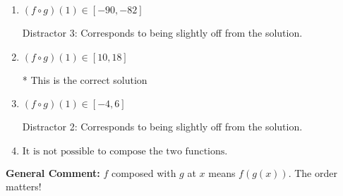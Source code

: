 \documentclass{extbook}[14pt]
\begin{document}
\begin{enumerate}
{\begin{enumerate}[label=\Alph*.]
 Distractor 1: Corresponds to reversing the composition.
\item \( (f \circ g)(1) \in [-90, -82] \)

 Distractor 3: Corresponds to being slightly off from the solution.
\item \( (f \circ g)(1) \in [10, 18] \)

* This is the correct solution
\item \( (f \circ g)(1) \in [-4, 6] \)

 Distractor 2: Corresponds to being slightly off from the solution.
\item \( \text{It is not possible to compose the two functions.} \)


\end{enumerate}

\textbf{General Comment:} $f$ composed with $g$ at $x$ means $f(g(x))$. The order matters!
}
\end{enumerate}
\end{document}
